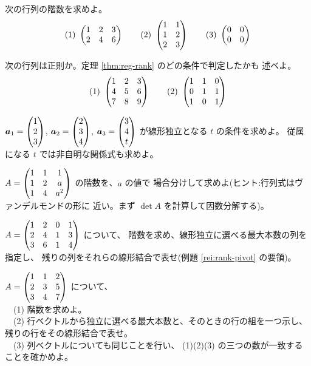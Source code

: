 \begin{mondai}[基本]\label{q:rank-ex3}
次の行列の階数を求めよ。
\[
(1)\ \begin{pmatrix}1 & 2 & 3 \\ 2 & 4 & 6\end{pmatrix} \qquad
(2)\ \begin{pmatrix}1 & 1 \\ 1 & 2 \\ 2 & 3\end{pmatrix} \qquad
(3)\ \begin{pmatrix}0 & 0 \\ 0 & 0\end{pmatrix}
\]
\end{mondai}

\begin{mondai}[基本]\label{q:rank-ex4}
次の行列は正則か。定理 \ref{thm:reg-rank} のどの条件で判定したかも
述べよ。
\[
(1)\ \mat{1 & 2 & 3 \\ 4 & 5 & 6 \\ 7 & 8 & 9} \qquad
(2)\ \mat{1 & 1 & 0 \\ 0 & 1 & 1 \\ 1 & 0 & 1}
\]
\end{mondai}

\begin{mondai}[標準]\label{q:rank-ex5}
$\bm{a}_1 = \begin{pmatrix}1 \\ 2 \\ 3\end{pmatrix}$, $\bm{a}_2 = \begin{pmatrix}2 \\ 3 \\ 4\end{pmatrix}$,
$\bm{a}_3 = \begin{pmatrix}3 \\ 4 \\ t\end{pmatrix}$ が線形独立となる $t$ の条件を求めよ。
従属になる $t$ では非自明な関係式も求めよ。
\end{mondai}

\begin{mondai}[標準]\label{q:rank-ex6}
$A = \begin{pmatrix}1 & 1 & 1 \\ 1 & 2 & a \\ 1 & 4 & a^2\end{pmatrix}$ の階数を、$a$ の値で
場合分けして求めよ(ヒント:行列式はヴァンデルモンドの形に
近い。まず $\det A$ を計算して因数分解する)。
\end{mondai}

\begin{mondai}[標準]\label{q:rank-ex7}
$A = \begin{pmatrix}1 & 2 & 0 & 1 \\ 2 & 4 & 1 & 3 \\ 3 & 6 & 1 & 4\end{pmatrix}$ について、
階数を求め、線形独立に選べる最大本数の列を指定し、
残りの列をそれらの線形結合で表せ(例題 \ref{rei:rank-pivot} の要領)。
\end{mondai}

\begin{mondai}[標準]\label{q:rank-ex8}
$A = \begin{pmatrix}1 & 1 & 2 \\ 2 & 3 & 5 \\ 3 & 4 & 7\end{pmatrix}$ について、\\
　(1) 階数を求めよ。\\
　(2) 行ベクトルから独立に選べる最大本数と、そのときの行の組を一つ示し、
残りの行をその線形結合で表せ。\\
　(3) 列ベクトルについても同じことを行い、
(1)(2)(3) の三つの数が一致することを確かめよ。
\end{mondai}

